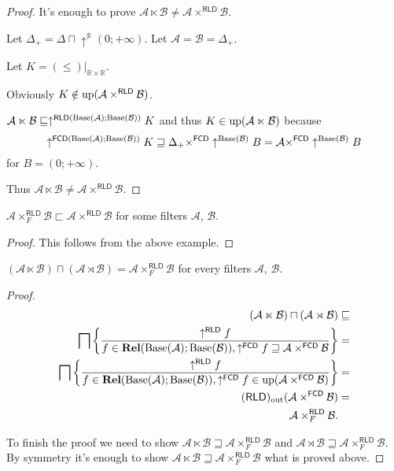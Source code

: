 \begin{proof}
It's enough to prove $\mathcal{A}\ltimes\mathcal{B}\neq\mathcal{A}\times^{\mathsf{RLD}}\mathcal{B}$.

Let $\Delta_{+}=\Delta\sqcap\uparrow^{\mathbb{R}}(0;+\infty)$. Let
$\mathcal{A}=\mathcal{B}=\Delta_{+}$.

Let $K=(\le)|_{\mathbb{R}\times\mathbb{R}}$.

Obviously $K\notin\operatorname{up}(\mathcal{A}\times^{\mathsf{RLD}}\mathcal{B})$.

$\mathcal{A}\ltimes\mathcal{B}\sqsubseteq\uparrow^{\mathsf{RLD}(\operatorname{Base}(\mathcal{A});\operatorname{Base}(\mathcal{B}))}K$
and thus $K\in\operatorname{up}(\mathcal{A}\ltimes\mathcal{B})$ because 
\[
\uparrow^{\mathsf{FCD}(\operatorname{Base}(\mathcal{A});\operatorname{Base}(\mathcal{B}))}K\sqsupseteq\Delta_{+}\times^{\mathsf{FCD}}\uparrow^{\operatorname{Base}(\mathcal{B})}B=\mathcal{A}\times^{\mathsf{FCD}}\uparrow^{\operatorname{Base}(\mathcal{B})}B
\]
for $B=(0;+\infty)$.

Thus $\mathcal{A}\ltimes\mathcal{B}\neq\mathcal{A}\times^{\mathsf{RLD}}\mathcal{B}$.\end{proof}
\begin{example}
\label{secprod-neq}$\mathcal{A}\times_{F}^{\mathsf{RLD}}\mathcal{B}\sqsubset\mathcal{A}\times^{\mathsf{RLD}}\mathcal{B}$
for some filters $\mathcal{A}$, $\mathcal{B}$.\end{example}
\begin{proof}
This follows from the above example.\end{proof}
\begin{prop}
$(\mathcal{A}\ltimes\mathcal{B})\sqcap(\mathcal{A}\rtimes\mathcal{B})=\mathcal{A}\times_{F}^{\mathsf{RLD}}\mathcal{B}$
for every filters $\mathcal{A}$, $\mathcal{B}$.\end{prop}
\begin{proof}
~
\begin{align*}
(\mathcal{A}\ltimes\mathcal{B})\sqcap(\mathcal{A}\rtimes\mathcal{B}) & \sqsubseteq\\
\bigsqcap\left\{ \frac{\uparrow^{\mathsf{RLD}}f}{f\in\mathbf{Rel}(\operatorname{Base}(\mathcal{A});\operatorname{Base}(\mathcal{B})),\uparrow^{\mathsf{FCD}}f\sqsupseteq\mathcal{A}\times^{\mathsf{FCD}}\mathcal{B}}\right\} & =\\
\bigsqcap\left\{ \frac{\uparrow^{\mathsf{RLD}}f}{f\in\mathbf{Rel}(\operatorname{Base}(\mathcal{A});\operatorname{Base}(\mathcal{B})),\uparrow^{\mathsf{FCD}}f\in\operatorname{up}(\mathcal{A}\times^{\mathsf{FCD}}\mathcal{B})}\right\} & =\\
(\mathsf{RLD})_{\mathrm{out}}(\mathcal{A}\times^{\mathsf{FCD}}\mathcal{B}) & =\\
\mathcal{A}\times_{F}^{\mathsf{RLD}}\mathcal{B}.
\end{align*}


To finish the proof we need to show $\mathcal{A}\ltimes\mathcal{B}\sqsupseteq\mathcal{A}\times_{F}^{\mathsf{RLD}}\mathcal{B}$
and $\mathcal{A}\rtimes\mathcal{B}\sqsupseteq\mathcal{A}\times_{F}^{\mathsf{RLD}}\mathcal{B}$.
By symmetry it's enough to show $\mathcal{A}\ltimes\mathcal{B}\sqsupseteq\mathcal{A}\times_{F}^{\mathsf{RLD}}\mathcal{B}$
what is proved above.\end{proof}
